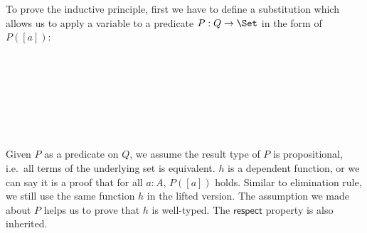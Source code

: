 To prove the inductive principle, first we have to define a substitution which allows us to apply a variable to a predicate $P : Q \to \Set$ in the form of $P([a])$:

\begin{code}\\
\>[0]\<[2]%
\>[2] \AgdaSymbol{:} \AgdaSymbol{(} \AgdaFunction{\&} \AgdaSymbol{)}  \AgdaSymbol{(} \AgdaFunction{\&} \AgdaSymbol{)}\<%
\\
\>[0]\<[2]%
\>[2] \AgdaSymbol{=} \<%
\\
\>[2]\<[11]%
\>[11]\AgdaSymbol{\{}  \AgdaSymbol{=}  \AgdaSymbol{\{(} \AgdaInductiveConstructor{,} \AgdaSymbol{)}   \AgdaInductiveConstructor{,} \AgdaSymbol{\}}\<%
\\
\>[2]\<[11]%
\>[11]\AgdaSymbol{;}  \AgdaSymbol{=}  \AgdaSymbol{(} \AgdaInductiveConstructor{,} \AgdaSymbol{)}   \AgdaInductiveConstructor{,} \AgdaSymbol{(} \AgdaSymbol{)\}}\<%
\\
\>[2]\<[11]%
\>[11]\AgdaSymbol{\}}\<%
\\
\end{code}

Given $P$ as a predicate on $Q$, we assume the result type of $P$ is propositional,  i.e.\ all terms of the underlying set is equivalent. $h$ is a dependent function, or we can say it is a proof that for all $a : A$, $P([a])$ holds.
Similar to elimination rule, we still use the same function $h$ in the lifted version.
The assumption we made about $P$ helps us to prove that $h$ is well-typed. The $\mathsf{respect}$ property is also inherited.

